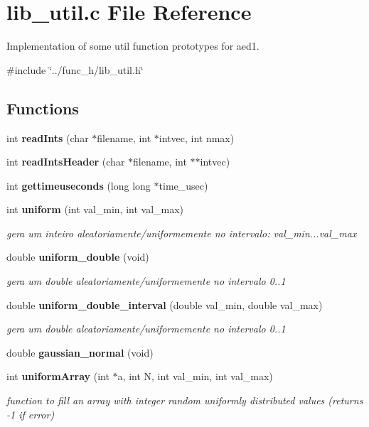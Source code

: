 \section{lib\+\_\+util.\+c File Reference}
\label{lib__util_8c}


Implementation of some util function prototypes for aed1.  


{\ttfamily \#include \char`\"{}../func\+\_\+h/lib\+\_\+util.\+h\char`\"{}}\newline
\subsection*{Functions}
\begin{DoxyCompactItemize}
\item 
int {\bf read\+Ints} (char $\ast$filename, int $\ast$intvec, int nmax)
\item 
int {\bf read\+Ints\+Header} (char $\ast$filename, int $\ast$$\ast$intvec)
\item 
int {\bf gettimeuseconds} (long long $\ast$time\+\_\+usec)
\item 
int {\bf uniform} (int val\+\_\+min, int val\+\_\+max)
\begin{DoxyCompactList}\small\item\em gera um inteiro aleatoriamente/uniformemente no intervalo\+: val\+\_\+min...val\+\_\+max \end{DoxyCompactList}\item 
double {\bf uniform\+\_\+double} (void)
\begin{DoxyCompactList}\small\item\em gera um double aleatoriamente/uniformemente no intervalo 0..1 \end{DoxyCompactList}\item 
double {\bf uniform\+\_\+double\+\_\+interval} (double val\+\_\+min, double val\+\_\+max)
\begin{DoxyCompactList}\small\item\em gera um double aleatoriamente/uniformemente no intervalo 0..1 \end{DoxyCompactList}\item 
double {\bf gaussian\+\_\+normal} (void)
\item 
int {\bf uniform\+Array} (int $\ast$a, int N, int val\+\_\+min, int val\+\_\+max)
\begin{DoxyCompactList}\small\item\em function to fill an array with integer random uniformly distributed values (returns -\/1 if error) \end{DoxyCompactList}\item 
$$
\end{DoxyCompactItemize}
